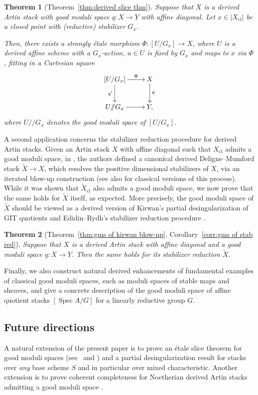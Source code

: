 \documentclass[a4paper,twoside,11pt]{amsart}
\theoremstyle{plain}
\newtheorem*{theorem*}{Theorem}
\theoremstyle{definition}
\theoremstyle{remark}
\numberwithin{equation}{section}
\DeclareMathOperator{\Spec}{Spec} %
\newcommand{\cl}{\mathrm{cl}} %
\def\git{/\!\!/}
\renewcommand{\tilde}{\widetilde}
\begin{document}
\begin{theorem*}[Theorem~\ref{thm:derived slice thm}]
Suppose that $X$ is a derived Artin stack with good moduli space $q\colon X\to Y$ with affine diagonal. Let $ x \in |X_\cl|$ be a closed point with (reductive) stabilizer $G_x$. 

Then, there exists a strongly \'{e}tale morphism $\Phi \colon [U / G_x] \to X$, where $U$ is a derived affine scheme with a $G_x$-action, $u \in U$ is fixed by $G_x$ and maps to $x$ via $\Phi$, fitting in a Cartesian square
    \begin{align*}
        \xymatrix{
        [U / G_x] \ar[d]_-{q'} \ar[r]^-{\Phi} & X \ar[d]^-{q} \\
        U \git G_x \ar[r] & Y,
        }
    \end{align*}
where $U \git G_x$ denotes the good moduli space of $[U/G_x]$.
\end{theorem*}

A second application concerns the stabilizer reduction procedure for derived Artin stacks. Given an Artin stack $X$ with affine diagonal such that $X_\cl$ admits a good moduli space, in \cite{HRS}, the authors defined a canonical derived Deligne--Mumford stack $\tilde{X} \to X$, which resolves the positive dimensional stabilizers of $X$, via an iterated blow-up construction (see also \cite{KiemLi,KLS,Sav} for classical versions of this process). While it was shown that $\tilde{X}_\cl$ also admits a good moduli space, we now prove that the same holds for $\tilde{X}$ itself, as expected. More precisely, the good moduli space of $\tilde{X}$ should be viewed as a derived version of Kirwan's partial desingularization of GIT quotients \cite{Kirwan} and Edidin--Rydh's stabilizer reduction procedure \cite{EdidinRydh}.

\begin{theorem*}[Theorem~\ref{thm:gms of kirwan blow-up}, Corollary~\ref{corr:gms of stab red}]
Suppose that $X$ is a derived Artin stack with affine diagonal and a good moduli space $q \colon X \to Y$. Then the same holds for its stabilizer reduction $\tilde{X}$.
\end{theorem*}

Finally, we also construct natural derived enhancements of fundamental examples of classical good moduli spaces, such as moduli spaces of stable maps and sheaves, and give a concrete description of the good moduli space of affine quotient stacks $[\Spec A / G]$ for a linearly reductive group $G$.

\subsection*{Future directions} A natural extension of the present paper is to prove an \'{e}tale slice theorem for good moduli spaces (see~\cite[Theorem~6.1]{AHR2} and \cite[Theorem~4.12]{AlperLuna}) and a partial desingularization result for stacks over \emph{any} base scheme $S$ and in particular over mixed characteristic. Another extension is to prove coherent completeness for Noetherian derived Artin stacks admitting a good moduli space \cite[Thm.~1.6]{AHR2}.
\end{document}
